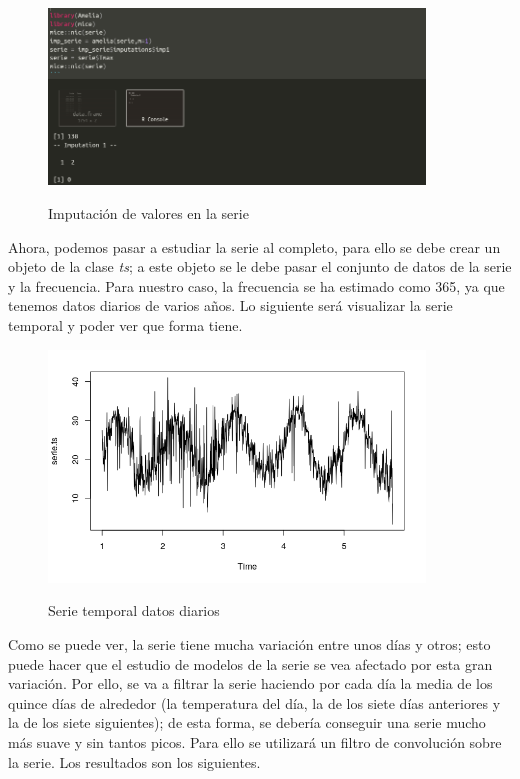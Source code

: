 \begin{figure}[H]
	\centering
	\includegraphics[width=100mm]{imagenes/imputation_diario.png}
	\label{fig:2}
	\caption{Imputación de valores en la serie}
\end{figure}
 
 Ahora, podemos pasar a estudiar la serie al completo, para ello se debe crear un objeto de la clase \textit{ts}; a este objeto se le debe pasar el conjunto de datos de la serie y la frecuencia. Para nuestro caso, la frecuencia se ha estimado como 365, ya que tenemos datos diarios de varios años. Lo siguiente será visualizar la serie temporal y poder ver que forma tiene.
 
 \begin{figure}[H]
 	\centering
 	\includegraphics[width=100mm]{imagenes/serie_ts.png}
 	\label{fig:3}
 	\caption{Serie temporal datos diarios}
 \end{figure}

Como se puede ver, la serie tiene mucha variación entre unos días y otros; esto puede hacer que el estudio de modelos de la serie se vea afectado por esta gran variación. Por ello, se va a filtrar la serie haciendo por cada día la media de los quince días de alrededor (la temperatura del día, la de los siete días anteriores  y la de los siete siguientes); de esta forma, se debería conseguir una serie mucho más suave y sin tantos picos. Para ello se utilizará un filtro de convolución sobre la serie. Los resultados son los siguientes.

